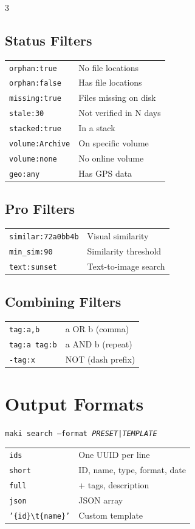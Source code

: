 \documentclass[a4paper,landscape,8pt]{article}
\newcommand{\cmd}[1]{\texttt{\footnotesize #1}}
\begin{document}
\begin{multicols}{3}
\subsection{Status Filters}
\begin{tabularx}{\columnwidth}{@{}lX@{}}
\cmd{orphan:true} & No file locations \\
\cmd{orphan:false} & Has file locations \\
\cmd{missing:true} & Files missing on disk \\
\cmd{stale:30} & Not verified in N days \\
\cmd{stacked:true} & In a stack \\
\cmd{volume:Archive} & On specific volume \\
\cmd{volume:none} & No online volume \\
\cmd{geo:any} & Has GPS data \\
\end{tabularx}

\subsection{Pro Filters}
\begin{tabularx}{\columnwidth}{@{}lX@{}}
\cmd{similar:72a0bb4b} & Visual similarity \\
\cmd{min\_sim:90} & Similarity threshold \\
\cmd{text:sunset} & Text-to-image search \\
\end{tabularx}

\subsection{Combining Filters}
\begin{tabularx}{\columnwidth}{@{}lX@{}}
\cmd{tag:a,b} & a OR b (comma) \\
\cmd{tag:a tag:b} & a AND b (repeat) \\
\cmd{-tag:x} & NOT (dash prefix) \\
\end{tabularx}

\section{Output Formats}

\cmd{maki search --format \textit{PRESET|TEMPLATE}}

\begin{tabularx}{\columnwidth}{@{}lX@{}}
\cmd{ids} & One UUID per line \\
\cmd{short} & ID, name, type, format, date \\
\cmd{full} & + tags, description \\
\cmd{json} & JSON array \\
\cmd{'\{id\}\textbackslash t\{name\}'} & Custom template \\
\end{tabularx}


\end{multicols}
\end{document}
